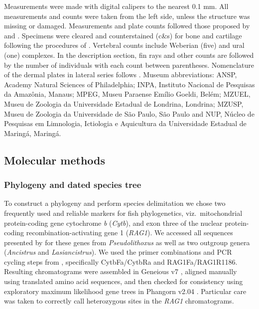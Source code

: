 \documentclass[12pt]{article}
\begin{document}
Measurements were made with digital calipers to the nearest 0.1 mm. %
All measurements and counts were taken from the left side, unless the structure was missing or damaged. %
Measurements and plate counts followed those proposed by \citet{Fisch-Muller2001} and \citet{Bifi2009}. %
Specimens were cleared and counterstained (c\&s) for bone and cartilage following the procedures of \citet{Taylor1985}. %
Vertebral counts include Weberian (five) and ural (one) complexes. %
In the description section, fin rays and other counts are followed by the number of individuals with each count between parentheses. %
Nomenclature of the dermal plates in lateral series follows \citet{Schaefer1997}. %
Museum abbreviations: ANSP, Academy Natural Sciences of Philadelphia; INPA, Instituto Nacional de Pesquisas da Amazônia, Manaus; MPEG, Museu Paraense Emílio Goeldi, Belém; MZUEL, Museu de Zoologia da Universidade Estadual de Londrina, Londrina; MZUSP, Museu de Zoologia da Universidade de São Paulo, São Paulo and NUP, Núcleo de Pesquisas em Limnologia, Ictiologia e Aquicultura da Universidade Estadual de Maringá, Maringá.%


\subsection*{Molecular methods}

\subsubsection*{Phylogeny and dated species tree}

To construct a phylogeny and perform species delimitation we chose two frequently used and reliable markers for fish phylogenetics, viz.\ mitochondrial protein-coding gene cytochrome \emph{b} (\emph{Cytb}), and exon three of the nuclear protein-coding recombination-activating gene 1 (\emph{RAG1}). %
We accessed all sequences presented by \citet{Lujan2015phylo} for these genes from \emph{Pseudolithoxus} as well as two outgroup genera (\emph{Ancistrus} and\emph{ Lasiancistrus}). %
We used the primer combinations and PCR cycling steps from \citet{Lujan2015phylo}, specifically CytbFa/CytbRa and RAG1Fa/RAG1R1186. Resulting chromatograms were assembled in Geneious v7 \citep{Kearse2012}, aligned manually using translated amino acid sequences, and then checked for consistency using exploratory maximum likelihood gene trees in Phangorn v2.04 \citep{Schliep2011}. %
Particular care was taken to correctly call heterozygous sites in the \emph{RAG1} chromatograms. 
\end{document}
